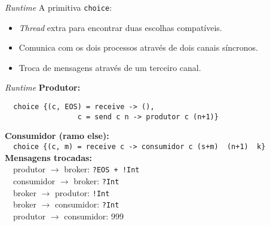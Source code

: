 \begin{frame}{\textit{Runtime}}
  A primitiva \lstinline|choice|:
  \begin{itemize}
  \item \textit{Thread} extra para encontrar duas escolhas compatíveis.
  \item Comunica com os dois processos através de dois canais síncronos.
  \item Troca de mensagens através de um terceiro canal.
  \end{itemize}
\end{frame}

\begin{frame}[fragile]{\textit{Runtime}}
  \textbf{Produtor:}\\
  \begin{lstlisting}
  choice {(c, EOS) = receive -> (),
                 c = send c n -> produtor c (n+1)}
\end{lstlisting}

\textbf{Consumidor (ramo else):}\\
$\quad$\lstinline|choice {(c, m) = receive c -> consumidor c (s+m)  (n+1)  k}|\\
\vspace{3mm}
\textbf{Mensagens trocadas:}\\
$\quad$produtor $\rightarrow$ broker: \lstinline|?EOS + !Int|\\
$\quad$consumidor $\rightarrow$ broker: \lstinline|?Int|\\
$\quad$broker $\rightarrow$ produtor: \lstinline|!Int|\\
$\quad$broker $\rightarrow$ consumidor: \lstinline|?Int|\\
$\quad$produtor $\rightarrow$ consumidor: 999

\end{frame}


